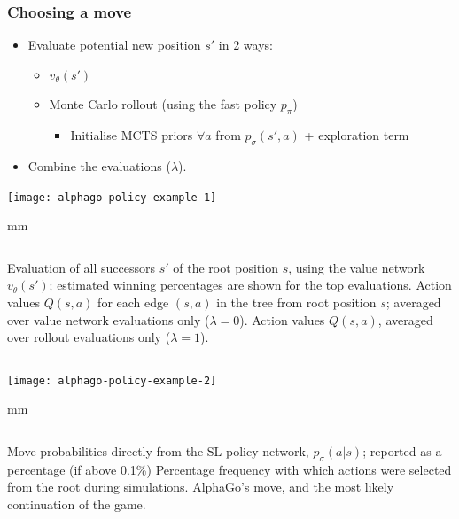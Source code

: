 \documentclass{beamer}
\begin{document}
\begin{frame}
  \frametitle{Choosing a move}
  \begin{itemize}
  \item Evaluate potential new position $s'$ in 2 ways:
    \begin{itemize}
    \item $v_\theta(s')$
    \item Monte Carlo rollout (using the fast policy $p_\pi$)
      \begin{itemize}
      \item Initialise MCTS priors $\forall a$ from $p_\sigma(s',a)$ + exploration term
      \end{itemize}
    \end{itemize}
    \item Combine the evaluations ($\lambda$).
  \end{itemize}
\end{frame}



\begin{frame}
  \begin{center}
    \texttt{[image: alphago-policy-example-1]}
  \end{center}
   mm
  \begin{columns}
    Evaluation of all successors $s′$ of the root position $s$, using the value network $v_\theta(s′)$; estimated winning percentages are shown for the top evaluations.
    Action values $Q(s, a)$ for each edge $(s, a)$ in the tree from root position $s$; averaged over value network evaluations only ($\lambda = 0$).
    Action values $Q(s, a)$, averaged over rollout evaluations only ($\lambda = 1$).
  \end{columns}
\end{frame}

\begin{frame}
  \begin{center}
    \texttt{[image: alphago-policy-example-2]}
  \end{center}
   mm
  \begin{columns}
    Move probabilities directly from the SL policy network, $p_\sigma(a|s)$; reported as a percentage (if above 0.1\%)
    Percentage frequency with which actions were selected from the root during simulations.
    AlphaGo's move, and the most likely continuation of the game.
  \end{columns}
\end{frame}
\end{document}
